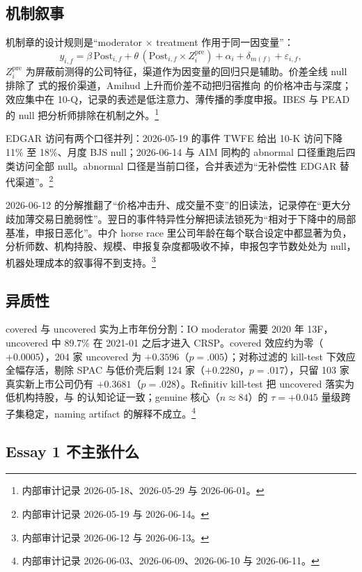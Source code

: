 \documentclass[a4paper,11pt]{ctexart}
\begin{document}
\subsection{机制叙事}\label{sec:02-mechanism}

机制章的设计规则是“moderator $\times$ treatment 作用于同一因变量”：
\begin{equation}\label{eq:02-channel}
y_{i,f}=\beta\,\mathrm{Post}_{i,f}+\theta\,(\mathrm{Post}_{i,f}\times Z_i^{\mathrm{pre}})+\alpha_i+\delta_{m(f)}+\varepsilon_{i,f},
\end{equation}
$Z_i^{\mathrm{pre}}$ 为屏蔽前测得的公司特征，渠道作为因变量的回归只是辅助。价差全线 null 排除了 \citet{glostenmilgrom1985} 式的报价渠道，Amihud 上升而价差不动把归宿推向 \citet{kyle1985} 的价格冲击与深度；效应集中在 10-Q，记录的表述是低注意力、薄传播的季度申报。IBES 与 PEAD 的 null 把分析师排除在机制之外。\footnote{内部审计记录 2026-05-18、2026-05-29 与 2026-06-01。}

EDGAR 访问有两个口径并列：2026-05-19 的事件 TWFE 给出 10-K 访问下降 11\% 至 18\%、月度 BJS null；2026-06-14 与 AIM 同构的 abnormal 口径重跑后四类访问全部 null。abnormal 口径是当前口径，合并表述为“无补偿性 EDGAR 替代渠道”。\footnote{内部审计记录 2026-05-19 与 2026-06-14。}

2026-06-12 的分解推翻了“价格冲击升、成交量不变”的旧读法，记录停在“更大分歧加薄交易日脆弱性”。翌日的事件特异性分解把读法锁死为“相对于下降中的局部基准，申报日恶化”。中介 horse race 里公司年龄在每个联合设定中都显著为负，分析师数、机构持股、规模、申报复杂度都吸收不掉，申报包字节数处处为 null，机器处理成本的叙事得不到支持。\footnote{内部审计记录 2026-06-12 与 2026-06-13。}

\subsection{异质性}\label{sec:02-hetero}

covered 与 uncovered 实为上市年份分割：IO moderator 需要 2020 年 13F，uncovered 中 89.7\% 在 2021-01 之后才进入 CRSP。covered 效应约为零（$+0.0005$），204 家 uncovered 为 $+0.3596$（$p=.005$）；对称过滤的 kill-test 下效应全幅存活，剔除 SPAC 与低价壳后剩 124 家（$+0.2280$，$p=.017$），只留 103 家真实新上市公司仍有 $+0.3681$（$p=.028$）。Refinitiv kill-test 把 uncovered 落实为低机构持股，与 \citet{merton1987} 的认知论证一致；genuine 核心（$n\approx 84$）的 $\tau=+0.045$ 量级跨子集稳定，naming artifact 的解释不成立。\footnote{内部审计记录 2026-06-03、2026-06-09、2026-06-10 与 2026-06-11。}

\subsection{Essay 1 不主张什么}\label{sec:02-notclaimed}
\end{document}
